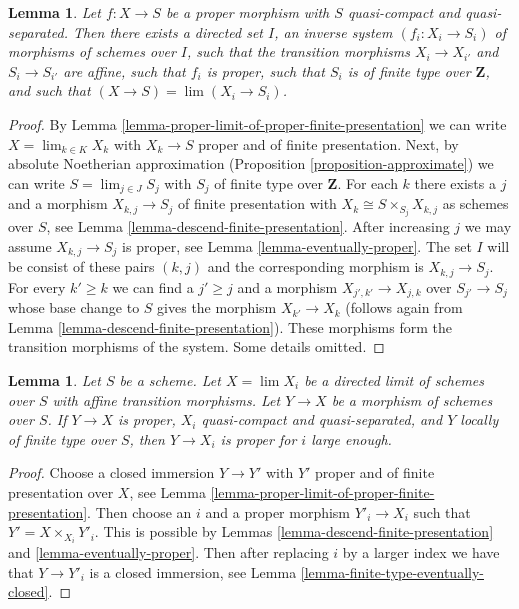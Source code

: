 \documentclass{stacks-project}
\theoremstyle{plain}
\newtheorem{lemma}[subsection]{Lemma}
\theoremstyle{definition}
\theoremstyle{remark}
\numberwithin{equation}{subsection}
\def\lim{\mathop{\mathrm{lim}}\nolimits}
\begin{document}
\begin{lemma}
\label{lemma-proper-limit-of-proper-finite-presentation-noetherian}
Let $f : X \to S$ be a proper morphism with $S$ quasi-compact and
quasi-separated. Then there exists a directed set $I$, an
inverse system $(f_i : X_i \to S_i)$ of morphisms of schemes over $I$,
such that the transition morphisms $X_i \to X_{i'}$ and $S_i \to S_{i'}$
are affine, such that $f_i$ is proper, such that $S_i$ is of finite
type over $\mathbf{Z}$, and such that
$(X \to S) = \lim (X_i \to S_i)$.
\end{lemma}

\begin{proof}
By Lemma \ref{lemma-proper-limit-of-proper-finite-presentation}
we can write $X = \lim_{k \in K} X_k$ with $X_k \to S$ proper and
of finite presentation. Next, by absolute Noetherian approximation
(Proposition \ref{proposition-approximate}) we can
write $S = \lim_{j \in J} S_j$ with $S_j$ of finite type over $\mathbf{Z}$.
For each $k$ there exists a $j$ and a morphism $X_{k, j} \to S_j$
of finite presentation with $X_k \cong S \times_{S_j} X_{k, j}$
as schemes over $S$, see
Lemma \ref{lemma-descend-finite-presentation}.
After increasing $j$ we may assume $X_{k, j} \to S_j$ is proper, see
Lemma \ref{lemma-eventually-proper}. The set $I$ will be consist
of these pairs $(k, j)$ and the corresponding morphism is $X_{k, j} \to S_j$.
For every $k' \geq k$ we can find a $j' \geq j$ and a morphism
$X_{j', k'} \to X_{j, k}$ over $S_{j'} \to S_j$ whose base change to $S$
gives the morphism $X_{k'} \to X_k$ (follows again from
Lemma \ref{lemma-descend-finite-presentation}).
These morphisms form the transition morphisms of the system. Some details
omitted.
\end{proof}

\begin{lemma}
\label{lemma-finite-type-eventually-proper}
Let $S$ be a scheme. Let $X = \lim X_i$ be a directed limit of
schemes over $S$ with affine transition morphisms. Let $Y \to X$
be a morphism of schemes over $S$.
If $Y \to X$ is proper, $X_i$ quasi-compact and quasi-separated, and
$Y$ locally of finite type over $S$, then $Y \to X_i$ is proper
for $i$ large enough.
\end{lemma}

\begin{proof}
Choose a closed immersion $Y \to Y'$ with $Y'$ proper and of finite
presentation over $X$, see
Lemma \ref{lemma-proper-limit-of-proper-finite-presentation}.
Then choose an $i$ and a proper morphism $Y'_i \to X_i$
such that $Y' = X \times_{X_i} Y'_i$. This is possible by
Lemmas \ref{lemma-descend-finite-presentation} and
\ref{lemma-eventually-proper}. Then after replacing $i$
by a larger index we have that $Y \to Y'_i$ is a closed
immersion, see Lemma \ref{lemma-finite-type-eventually-closed}.
\end{proof}
\end{document}
